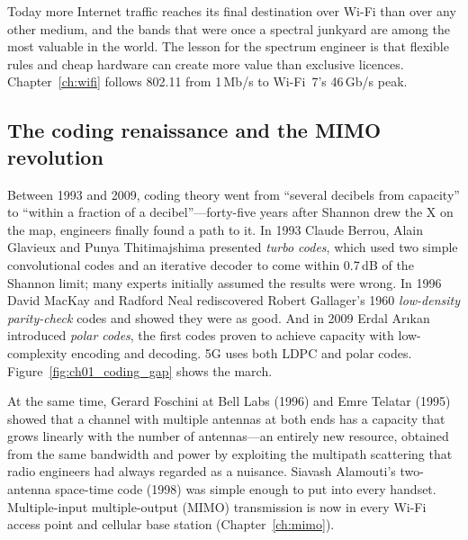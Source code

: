 Today more Internet traffic reaches its final destination over Wi-Fi than over any other medium, and
the bands that were once a spectral junkyard are among the most valuable in the world. The lesson for
the spectrum engineer is that flexible rules and cheap hardware can create more value than exclusive
licences. Chapter~\ref{ch:wifi} follows 802.11 from 1\,Mb/s to Wi-Fi~7's 46\,Gb/s peak.

\subsection{The coding renaissance and the MIMO revolution}

Between 1993 and 2009, coding theory went from ``several decibels from capacity'' to ``within a fraction
of a decibel''---forty-five years after Shannon drew the X on the map, engineers finally found a path
to it. In 1993 Claude Berrou, Alain Glavieux and Punya Thitimajshima presented \emph{turbo codes},
which used two simple convolutional codes and an iterative decoder to come within 0.7\,dB of the
Shannon limit; many experts initially assumed the results were wrong. In 1996 David MacKay and Radford
Neal rediscovered Robert Gallager's 1960 \emph{low-density parity-check} codes and showed they were as
good. And in 2009 Erdal Ar{\i}kan introduced \emph{polar codes}, the first codes proven to achieve
capacity with low-complexity encoding and decoding. 5G uses both LDPC and polar codes.
Figure~\ref{fig:ch01_coding_gap} shows the march.


At the same time, Gerard Foschini at Bell Labs (1996) and Emre Telatar (1995) showed that a channel with
multiple antennas at both ends has a capacity that grows linearly with the number of antennas---an
entirely new resource, obtained from the same bandwidth and power by exploiting the multipath scattering
that radio engineers had always regarded as a nuisance. Siavash Alamouti's two-antenna space-time code
(1998) was simple enough to put into every handset. Multiple-input multiple-output (MIMO) transmission is
now in every Wi-Fi access point and cellular base station (Chapter~\ref{ch:mimo}).

